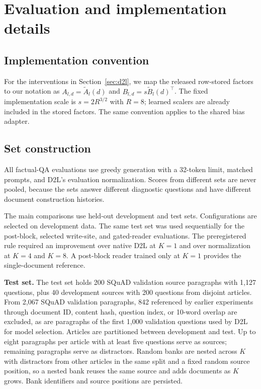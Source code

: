 \section{Evaluation and implementation details}
\label{sec:extended-methods}

\subsection{Implementation convention}
For the interventions in Section~\ref{sec:d2l}, we map the released
row-stored factors to our notation as
$A_{l,d}=\widetilde A_l(d)$ and $B_{l,d}=s\widetilde B_l(d)^\top$.
The fixed implementation scale is $s=2R^{3/2}$ with $R=8$;
learned scalers are already included in the stored factors.
The same convention applies to the shared bias adapter.

\subsection{Set construction}
\label{sec:set-details}
All factual-QA evaluations use greedy generation with a 32-token limit, matched
prompts, and D2L's evaluation normalization.
Scores from different sets are never pooled, because the sets answer different
diagnostic questions and have different document construction histories.

The main comparisons use held-out development and test sets. Configurations
are selected on development data. The same test set was used sequentially for
the post-block, selected write-site, and gated-reader evaluations. The
preregistered rule required an improvement over native D2L at $K=1$ and over
normalization at $K=4$ and $K=8$. A post-block reader trained only at $K=1$
provides the single-document reference.

\textbf{Test set.} The test set holds 200 SQuAD validation source
paragraphs with 1,127 questions, plus 40 development sources with 200 questions from
disjoint articles. From 2,067 SQuAD validation paragraphs, 842 referenced by earlier
experiments through document ID, content hash, question index, or 10-word overlap are
excluded, as are paragraphs of the first 1,000 validation questions used by D2L for
model selection. Articles are partitioned between development and test. Up to eight
paragraphs per article with at least five questions serve as sources; remaining
paragraphs serve as distractors. Random banks are nested across $K$ with distractors
from other articles in the same split and a fixed random source position, so a nested
bank reuses the same source and adds documents as $K$ grows.
Bank identifiers and source positions are persisted.

